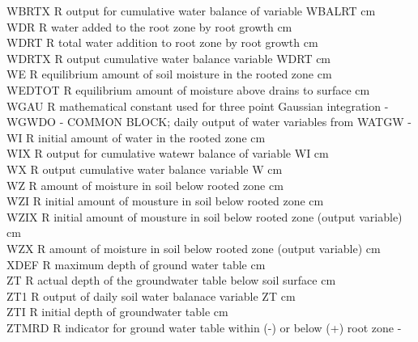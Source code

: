 \documentclass[11pt]{article}
\begin{document}
\begin{tabbing}
WBRTX\> \> R\> output for cumulative water balance of variable WBALRT\> \> \> \> \> \> \> cm\\
WDR\> \> R\> water added to the root zone by root growth\> \> \> \> \> \> \> cm\\
WDRT\> \> R\> total water addition to root zone by root growth\> \> \> \> \> \> \> cm\\
WDRTX\> \> R\> output cumulative water balance variable WDRT\> \> \> \> \> \> \> cm\\
WE\> \> R\> equilibrium amount of soil moisture in the rooted zone\> \> \> \> \> \> \> cm\\
WEDTOT\> \> R\> equilibrium amount of moisture above drains to surface\> \> \> \> \> \> \> cm\\
WGAU\> \> R\> mathematical constant used for three point Gaussian integration\> \> \> \> \> \> \> -\\
WGWDO\> \> -\> COMMON BLOCK; daily output of water variables from WATGW\> \> \> \> \> \> \> -\\
WI\> \> R\> initial amount of water in the rooted zone\> \> \> \> \> \> \> cm\\
WIX\> \> R\> output for cumulative watewr balance of variable WI\> \> \> \> \> \> \> cm\\
WX\> \> R\> output cumulative water balance variable W\> \> \> \> \> \> \> cm\\
WZ\> \> R\> amount of moisture in soil below rooted zone\> \> \> \> \> \> \> cm\\
WZI\> \> R\> initial amount of mousture in soil below rooted zone\> \> \> \> \> \> \> cm\\
WZIX\> \> R\> initial amount of mousture in soil below rooted zone (output variable)\> \> \> \> \> \> \> cm\\
WZX\> \> R\> amount of moisture in soil below rooted zone (output variable)\> \> \> \> \> \> \> cm\\
XDEF\> \> R\> maximum depth of ground water table\> \> \> \> \> \> \> cm\\
ZT\> \> R\> actual depth of the groundwater table below soil surface\> \> \> \> \> \> \> cm\\
ZT1\> \> R\> output of daily soil water balanace variable ZT\> \> \> \> \> \> \> cm\\
ZTI\> \> R\> initial depth of groundwater table\> \> \> \> \> \> \> cm\\
ZTMRD\> \> R\> indicator for ground water table within (-) or below (+) root zone\> \> \> \> \> \> \> -
\end{tabbing}
\end{document}
